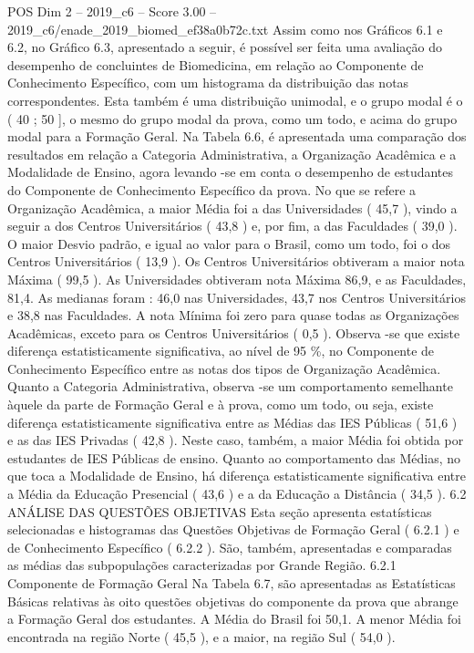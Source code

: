\begin{textsample}{POS Dim 2 – 2019\_c6 – Score 3.00 – 2019\_c6/enade\_2019\_biomed\_ef38a0b72c.txt}
Assim como nos Gráficos 6.1 e 6.2, no Gráfico 6.3, apresentado a seguir, é possível ser feita uma avaliação do desempenho de concluintes de Biomedicina, em relação ao Componente de Conhecimento Específico, com um histograma da distribuição das notas correspondentes.
Esta também é uma distribuição unimodal, e o grupo modal é o ( 40 ; 50 ], o mesmo do grupo modal da prova, como um todo, e acima do grupo modal para a Formação Geral.
Na Tabela 6.6, é apresentada uma comparação dos resultados em relação a Categoria Administrativa, a Organização Acadêmica e a Modalidade de Ensino, agora levando -se em conta o desempenho de estudantes do Componente de Conhecimento Específico da prova.
No que se refere a Organização Acadêmica, a maior Média foi a das Universidades ( 45,7 ), vindo a seguir a dos Centros Universitários ( 43,8 ) e, por fim, a das Faculdades ( 39,0 ).
O maior Desvio padrão, e igual ao valor para o Brasil, como um todo, foi o dos Centros Universitários ( 13,9 ).
Os Centros Universitários obtiveram a maior nota Máxima ( 99,5 ).
As Universidades obtiveram nota Máxima 86,9, e as Faculdades, 81,4.
As medianas foram : 46,0 nas Universidades, 43,7 nos Centros Universitários e 38,8 nas Faculdades.
A nota Mínima foi zero para quase todas as Organizações Acadêmicas, exceto para os Centros Universitários ( 0,5 ).
Observa -se que existe diferença estatisticamente significativa, ao nível de 95 \%, no Componente de Conhecimento Específico entre as notas dos tipos de Organização Acadêmica.
Quanto a Categoria Administrativa, observa -se um comportamento semelhante àquele da parte de Formação Geral e à prova, como um todo, ou seja, existe diferença estatisticamente significativa entre as Médias das IES Públicas ( 51,6 ) e as das IES Privadas ( 42,8 ).
Neste caso, também, a maior Média foi obtida por estudantes de IES Públicas de ensino.
Quanto ao comportamento das Médias, no que toca a Modalidade de Ensino, há diferença estatisticamente significativa entre a Média da Educação Presencial ( 43,6 ) e a da Educação a Distância ( 34,5 ). 6.2 ANÁLISE DAS QUESTÕES OBJETIVAS Esta seção apresenta estatísticas selecionadas e histogramas das Questões Objetivas de Formação Geral ( 6.2.1 ) e de Conhecimento Específico ( 6.2.2 ).
São, também, apresentadas e comparadas as médias das subpopulações caracterizadas por Grande Região. 6.2.1 Componente de Formação Geral Na Tabela 6.7, são apresentadas as Estatísticas Básicas relativas às oito questões objetivas do componente da prova que abrange a Formação Geral dos estudantes.
A Média do Brasil foi 50,1.
A menor Média foi encontrada na região Norte ( 45,5 ), e a maior, na região Sul ( 54,0 ).

\end{textsample}
